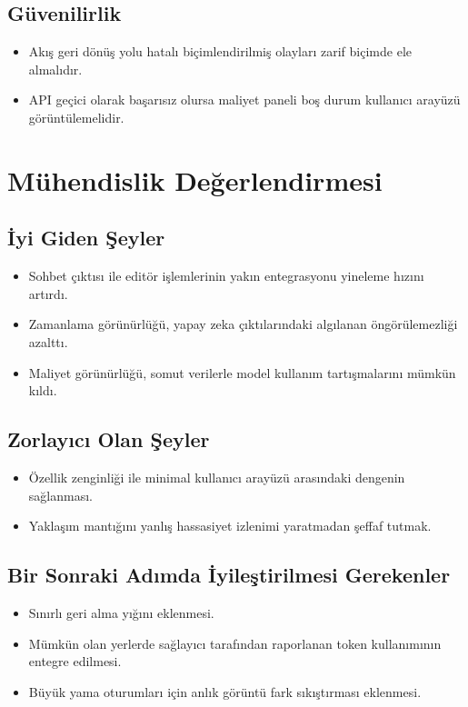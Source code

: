 \documentclass[12pt,a4paper]{article}
\begin{document}
\subsection{Güvenilirlik}
\begin{itemize}[leftmargin=*]
  \item Akış geri dönüş yolu hatalı biçimlendirilmiş olayları zarif biçimde ele almalıdır.
  \item API geçici olarak başarısız olursa maliyet paneli boş durum kullanıcı arayüzü görüntülemelidir.
\end{itemize}

\section{Mühendislik Değerlendirmesi}

\subsection{İyi Giden Şeyler}
\begin{itemize}[leftmargin=*]
  \item Sohbet çıktısı ile editör işlemlerinin yakın entegrasyonu yineleme hızını artırdı.
  \item Zamanlama görünürlüğü, yapay zeka çıktılarındaki algılanan öngörülemezliği azalttı.
  \item Maliyet görünürlüğü, somut verilerle model kullanım tartışmalarını mümkün kıldı.
\end{itemize}

\subsection{Zorlayıcı Olan Şeyler}
\begin{itemize}[leftmargin=*]
  \item Özellik zenginliği ile minimal kullanıcı arayüzü arasındaki dengenin sağlanması.
  \item Yaklaşım mantığını yanlış hassasiyet izlenimi yaratmadan şeffaf tutmak.
\end{itemize}

\subsection{Bir Sonraki Adımda İyileştirilmesi Gerekenler}
\begin{itemize}[leftmargin=*]
  \item Sınırlı geri alma yığını eklenmesi.
  \item Mümkün olan yerlerde sağlayıcı tarafından raporlanan token kullanımının entegre edilmesi.
  \item Büyük yama oturumları için anlık görüntü fark sıkıştırması eklenmesi.
\end{itemize}
\end{document}
